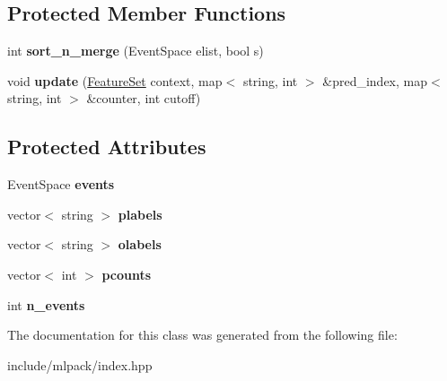 \subsection*{Protected Member Functions}
\begin{DoxyCompactItemize}
\item 
\hypertarget{classmlpack_1_1_base_data_indexer_adff552c54379efa08d23d21ea170f7e8}{
int {\bfseries sort\_\-n\_\-merge} (EventSpace elist, bool s)}
\label{classmlpack_1_1_base_data_indexer_adff552c54379efa08d23d21ea170f7e8}

\item 
\hypertarget{classmlpack_1_1_base_data_indexer_aad9a6ca736ededac457b7f706085d71f}{
void {\bfseries update} (\hyperlink{structmlpack_1_1_feature_set}{FeatureSet} context, map$<$ string, int $>$ \&pred\_\-index, map$<$ string, int $>$ \&counter, int cutoff)}
\label{classmlpack_1_1_base_data_indexer_aad9a6ca736ededac457b7f706085d71f}

\end{DoxyCompactItemize}
\subsection*{Protected Attributes}
\begin{DoxyCompactItemize}
\item 
\hypertarget{classmlpack_1_1_base_data_indexer_a6f1f70488b08e36dbca9c8e169dd0eac}{
EventSpace {\bfseries events}}
\label{classmlpack_1_1_base_data_indexer_a6f1f70488b08e36dbca9c8e169dd0eac}

\item 
\hypertarget{classmlpack_1_1_base_data_indexer_ac5e15e4a1bd23097dc69735c22c3b0b3}{
vector$<$ string $>$ {\bfseries plabels}}
\label{classmlpack_1_1_base_data_indexer_ac5e15e4a1bd23097dc69735c22c3b0b3}

\item 
\hypertarget{classmlpack_1_1_base_data_indexer_a03fe152079ac7f7651481574c56e9966}{
vector$<$ string $>$ {\bfseries olabels}}
\label{classmlpack_1_1_base_data_indexer_a03fe152079ac7f7651481574c56e9966}

\item 
\hypertarget{classmlpack_1_1_base_data_indexer_a931a85f90cfc730447468a0bae76ea01}{
vector$<$ int $>$ {\bfseries pcounts}}
\label{classmlpack_1_1_base_data_indexer_a931a85f90cfc730447468a0bae76ea01}

\item 
\hypertarget{classmlpack_1_1_base_data_indexer_a6ff416d6739c46e1bd76df92e2a5c2b3}{
int {\bfseries n\_\-events}}
\label{classmlpack_1_1_base_data_indexer_a6ff416d6739c46e1bd76df92e2a5c2b3}

\end{DoxyCompactItemize}


The documentation for this class was generated from the following file:\begin{DoxyCompactItemize}
\item 
include/mlpack/index.hpp\end{DoxyCompactItemize}
